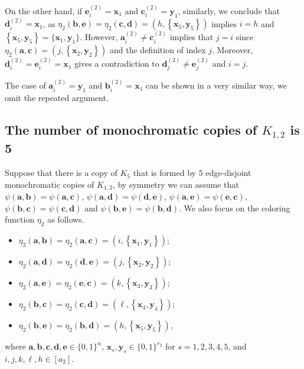 \documentclass[11pt]{article}
\theoremstyle{definition}
\newcommand{\aaa}{\boldsymbol{a}}
\newcommand{\bb}{\boldsymbol{b}}
\newcommand{\cc}{\boldsymbol{c}}
\newcommand{\dd}{\boldsymbol{d}}
\newcommand{\ee}{\boldsymbol{e}}
\begin{document}
On the other hand, if $\boldsymbol{e}_i^{(2)}=\boldsymbol{x}_{1}$ and
$\boldsymbol{c}_i^{(2)}=\boldsymbol{y}_{1}$, similarly, we conclude that $\boldsymbol{d}_i^{(2)}=\boldsymbol{x}_{1}$, as $\eta_{2}(\bb,\ee)=\eta_{2}(\cc,\dd)=(h,\left\{\boldsymbol{x}_{5},\boldsymbol{y}_{5}\right\})$ implies $i=h$ and $\left\{\boldsymbol{x}_{5},\boldsymbol{y}_{5}\right\}=\{\boldsymbol{x}_{1},\boldsymbol{y}_{1}\}$. However, $\boldsymbol{a}_{i}^{(2)}\neq\boldsymbol{c}_{i}^{(2)}$ implies that $j=i$ since $\eta_{2}(\aaa,\cc)=(j,\left\{\boldsymbol{x}_{2},\boldsymbol{y}_{2}\right\})$ and the definition of index $j$. Moreover, $\boldsymbol{d}_{i}^{(2)}=\ee_{i}^{(2)}=\boldsymbol{x}_{1}$ gives a  contradiction to $\dd_{j}^{(2)}\neq\ee_{j}^{(2)}$ and $i=j$.

The case of $\aaa_{i}^{(2)}=\boldsymbol{y}_{1}$ and $\bb_{i}^{(2)}=\boldsymbol{x}_{1}$ can be shown in a very similar way, we omit the repeated argument.

\subsection{The number of monochromatic copies of $K_{1,2}$ is 5}

Suppose that there is a copy of $K_{5}$ that is formed by $5$ edge-disjoint monochromatic copies of $K_{1,2}$, by symmetry we can assume that $\psi(\aaa,\bb)=\psi(\aaa,\cc)$, $\psi(\aaa,\dd)=\psi(\dd,\ee)$, $\psi(\aaa,\ee)=\psi(\ee,\cc)$, $\psi(\bb,\cc)=\psi(\cc,\dd)$ and $\psi(\bb,\ee)=\psi(\bb,\dd)$. 
We also focus on the coloring function $\eta_{2}$ as follows.
\begin{itemize}
    \item $\eta_{2}(\aaa,\bb)=\eta_{2}(\aaa,\cc)=(i,\left\{\boldsymbol{x}_{1},\boldsymbol{y}_{1}\right\})$;
    \item $\eta_{2}(\aaa,\dd)=\eta_{2}(\dd,\ee)=(j,\left\{\boldsymbol{x}_{2},\boldsymbol{y}_{2}\right\})$;
    \item $\eta_{2}(\aaa,\ee)=\eta_{2}(\ee,\cc)=(k,\left\{\boldsymbol{x}_{3},\boldsymbol{y}_{3}\right\})$;
    \item $\eta_{2}(\bb,\cc)=\eta_{2}(\cc,\dd)=(\ell,\left\{\boldsymbol{x}_{4},\boldsymbol{y}_{4}\right\})$;
    \item $\eta_{2}(\bb,\ee)=\eta_{2}(\bb,\dd)=(h,\left\{\boldsymbol{x}_{5},\boldsymbol{y}_{5}\right\})$,
\end{itemize}
where $\boldsymbol{a},\bb,\cc,\dd,\ee\in\{0,1\}^{\alpha}$, $\boldsymbol{x}_{s},\boldsymbol{y}_{s}\in\{0,1\}^{r_{2}}$ for $s=1,2,3,4,5$, and $i,j,k,\ell,h\in [a_{2}]$.
\end{document}
